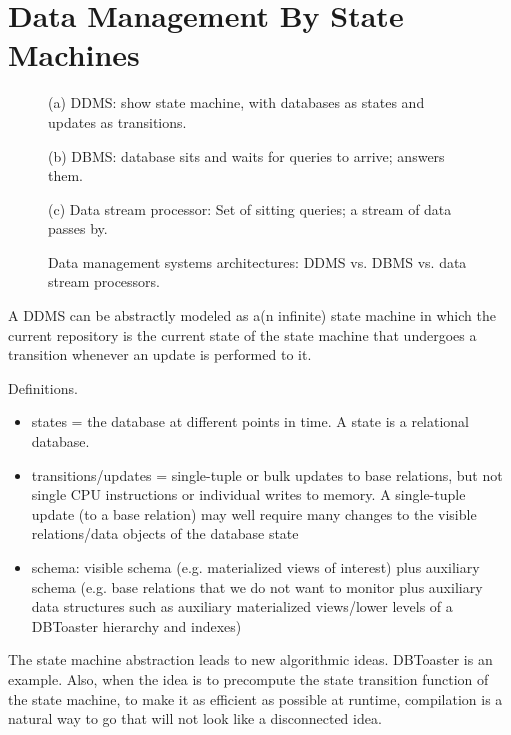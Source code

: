 

\section{Data Management By State Machines}


\begin{figure}
(a) DDMS: show state machine, with databases as states and updates as transitions.

(b) DBMS: database sits and waits for queries to arrive; answers them.

(c) Data stream processor: Set of sitting queries; a stream of data passes by.

\caption{Data management systems architectures: DDMS vs. DBMS vs. data stream processors.}
\end{figure}



A DDMS can be abstractly modeled as a(n infinite) state machine in which the current repository is the current state of the state machine that undergoes a transition whenever an update is performed to it.

Definitions.
\begin{itemize}
\item
states = the database at different points in time. A state is a relational database.

\item
transitions/updates = single-tuple or bulk updates to base relations, but not single CPU instructions or individual writes to memory. A single-tuple update (to a base relation) may well require many changes to the visible relations/data objects of the database state

\item
schema: visible schema (e.g. materialized views of interest) plus auxiliary schema (e.g. base relations that we do not want to monitor plus auxiliary data structures such as auxiliary materialized views/lower levels of a DBToaster hierarchy and indexes)
\end{itemize}


The state machine abstraction leads to new algorithmic ideas. DBToaster is an example. Also, when the idea is to precompute the state transition function of the state machine, to make it as efficient as possible at runtime, compilation is a natural way to go that will not look like a disconnected idea.


